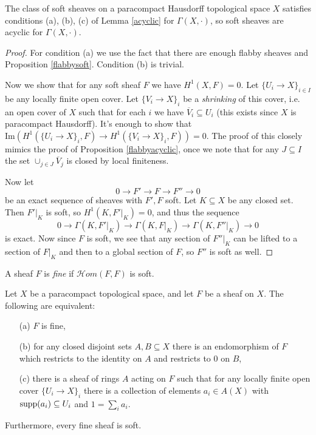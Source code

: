 \begin{prop} The class of soft sheaves on a paracompact Hausdorff topological space $X$ satisfies conditions {\rm (a), (b), (c)} of Lemma \ref{acyclic} for $\Gamma(X,\cdot)$, so soft sheaves are acyclic for $\Gamma(X,\cdot)$.
\end{prop}
\begin{proof} For condition (a) we use the fact that there are enough flabby sheaves and Proposition \ref{flabbysoft}. Condition (b) is trivial.

Now we show that for any soft sheaf $F$ we have $H^1(X,F) = 0$. Let $\{U_i\rightarrow X\}_{i\in I}$ be any locally finite open cover. Let $\{V_i\rightarrow X\}_i$ be a \emph{shrinking} of this cover, i.e. an open cover of $X$ such that for each $i$ we have $\overline{V}_i \subseteq U_i$ (this exists since $X$ is paracompact Hausdorff). It's enough to show that $\mbox{Im}(H^1(\{U_i\rightarrow X\}_i,F)\rightarrow H^1(\{V_i\rightarrow X\}_i,F)) = 0$. The proof of this closely mimics the proof of Proposition \ref{flabbyacyclic}, once we note that for any $J\subseteq I$ the set $\cup_{j\in J}\overline{V}_j$ is closed by local finiteness.

Now let
\[
0 \rightarrow F' \rightarrow F \rightarrow F'' \rightarrow 0
\]
be an exact sequence of sheaves with $F', F$ soft. Let $K\subseteq X$ be any closed set. Then $F'|_K$ is soft, so $H^1(K,F'|_K) = 0$, and thus the sequence
\[
0 \rightarrow \Gamma(K,F'|_K) \rightarrow \Gamma(K,F|_K) \rightarrow \Gamma(K,F''|_K) \rightarrow 0
\]
is exact. Now since $F$ is soft, we see that any section of $F''|_K$ can be lifted to a section of $F|_K$ and then to a global section of $F$, so $F''$ is soft as well.
\end{proof}

\begin{defn} A sheaf $F$ is \emph{fine} if $\mathcal{H}om(F,F)$ is soft.
\end{defn}

\begin{prop}\label{fine} Let $X$ be a paracompact topological space, and let $F$ be a sheaf on $X$. The following are equivalent:
\begin{itemize}
\item[{\rm (a)}] $F$ is fine,

\item[{\rm (b)}] for any closed disjoint sets $A,B\subseteq X$ there is an endomorphism of $F$ which restricts to the identity on $A$ and restricts to $0$ on $B$,

\item[{\rm (c)}] there is a sheaf of rings $A$ acting on $F$ such that for any locally finite open cover $\{U_i \rightarrow X\}_i$ there is a collection of elements $a_i \in A(X)$ with $\mbox{\rm supp}(a_i) \subseteq U_i$ and $1 = \sum_i a_i$.
\end{itemize}
Furthermore, every fine sheaf is soft.
\end{prop}

